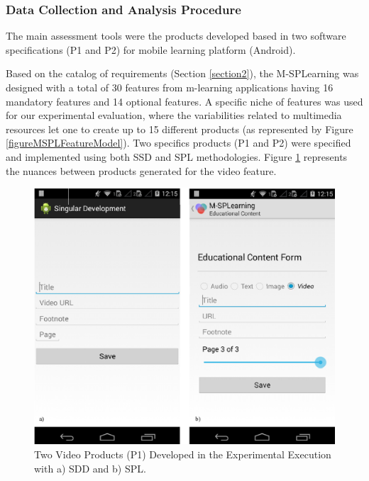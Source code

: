 \subsubsection{Data Collection and Analysis Procedure}



The main assessment tools were the products developed based in two software specifications (P1 and P2) for mobile learning platform (Android).

Based on the catalog of requirements (Section \ref{section2}), the M-SPLearning was designed with a total of 30 features from m-learning applications having 16 mandatory features and 14 optional features. A specific niche of features was used for our experimental evaluation, where the variabilities related to multimedia resources let one to create up to 15 different products (as represented by Figure \ref{figureMSPLFeatureModel}). Two specifics products (P1 and P2) were specified and implemented using both SSD and SPL methodologies. Figure \ref{fig:prod} represents the nuances between products generated for the video feature.


\begin{figure}[t]
\centering
\includegraphics[scale=0.2]{figures/section4/prod.eps}
\centering
\caption{Two Video Products (P1) Developed in the Experimental Execution with a) SDD and b) SPL.}
\label{fig:prod}
\end{figure}


